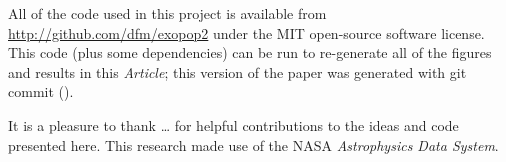 \documentclass[12pt,preprint]{aastex}
\newcommand{\project}[1]{\textsl{#1}}
\newcommand{\paper}{\textsl{Article}}
\newcommand{\figlabel}[1]{\label{fig:#1}}
\begin{document}
All of the code used in this project is available from
\url{http://github.com/dfm/exopop2} under the MIT open-source software license.
This code (plus some dependencies) can be run to re-generate all of the
figures and results in this \paper; this version of the paper was generated
with git commit \texttt{\githash} (\gitdate).

\acknowledgments
It is a pleasure to thank
\ldots
for helpful contributions to the ideas and code presented here.
This research made use of the NASA \project{Astrophysics Data System}.



\end{document}
